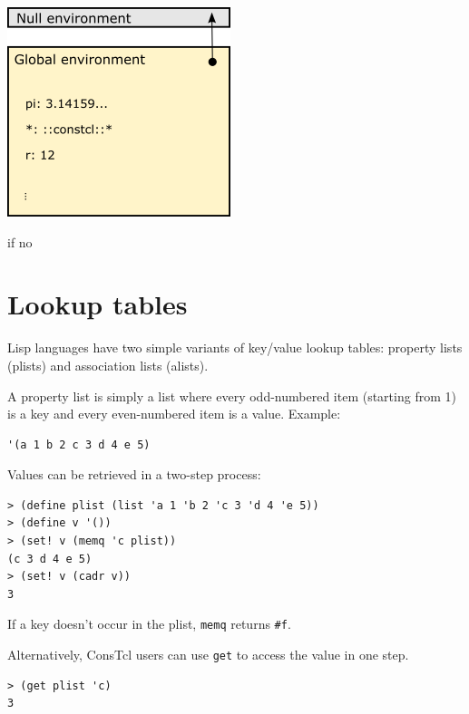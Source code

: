 \documentclass[twoside,9pt]{report}
\begin{document}
\includegraphics{images/env1.png}


if no {

\chapter{Lookup tables}
\label{lookup-tables}

Lisp languages have two simple variants of key/value lookup tables: property lists (plists) and association lists (alists).


A property list is simply a list where every odd-numbered item (starting from 1) is a key and every even-numbered item is a value. Example:

\noindent\makebox[\linewidth]{\rule{\linewidth}{0.4pt}}
\begin{lstlisting}
'(a 1 b 2 c 3 d 4 e 5)
\end{lstlisting}
\noindent\makebox[\linewidth]{\rule{\linewidth}{0.4pt}}

Values can be retrieved in a two-step process:

\noindent\makebox[\linewidth]{\rule{\linewidth}{0.4pt}}
\begin{lstlisting}
> (define plist (list 'a 1 'b 2 'c 3 'd 4 'e 5))
> (define v '())
> (set! v (memq 'c plist))
(c 3 d 4 e 5)
> (set! v (cadr v))
3
\end{lstlisting}
\noindent\makebox[\linewidth]{\rule{\linewidth}{0.4pt}}

If a key doesn't occur in the plist, \texttt{memq} returns \texttt{\#f}.


Alternatively, ConsTcl users can use \texttt{get} to access the value in one step.

\noindent\makebox[\linewidth]{\rule{\linewidth}{0.4pt}}
\begin{lstlisting}
> (get plist 'c)
3
\end{lstlisting}
\noindent\makebox[\linewidth]{\rule{\linewidth}{0.4pt}}

}
\end{document}
